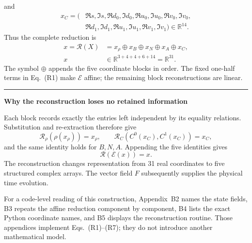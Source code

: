 \documentclass[10pt,letterpaper,twocolumn]{article}
\newcommand{\R}{\mathbb R}
\newcommand{\tracebox}[3]{%
  \par\smallskip
  \noindent\begin{minipage}{\columnwidth}
    {\color{#1}\rule{\columnwidth}{1.1pt}}\par\vspace{-1pt}
    \small\textbf{\color{#1}#3}\par\smallskip\color{black}
}
\newcommand{\closetracebox}{%
  \par\vspace{1pt}{\color{navy!35}\rule{\columnwidth}{0.35pt}}
  \end{minipage}\par\smallskip
}
\begin{document}
and
{\footnotesize
\[
\begin{aligned}
x_C=(&\Re s,\Im s,
\Re d_0,\Im d_0,\Re u_0,\Im u_0,\Re v_0,\Im v_0,\\
&\Re d_1,\Im d_1,\Re u_1,\Im u_1,\Re v_1,\Im v_1)
\in\R^{14}.
\end{aligned}
\tag{R6}
\]
}
Thus the complete reduction is
\[
\boxed{
\begin{aligned}
x=\mathcal R(X)
&=x_\rho\oplus x_B\oplus x_N\oplus x_A\oplus x_C,\\
x&\in\R^{3+4+4+6+14}=\R^{31}.
\end{aligned}}
\tag{R7}
\]
The symbol \(\oplus\) appends the five coordinate blocks in order.  The fixed
one-half terms in Eq.~(R1) make \(\mathcal E\) affine; the remaining block
reconstructions are linear.

\tracebox{navy}{paleblue}{Why the reconstruction loses no retained information}
Each block records exactly the entries left independent by its equality
relations.  Substitution and re-extraction therefore give
\[
\mathcal R_\rho(\rho(x_\rho))=x_\rho,
\qquad
\mathcal R_C(C^0(x_C),C^1(x_C))=x_C,
\]
and the same identity holds for \(B,N,A\).  Appending the five identities
gives
\[
\boxed{\mathcal R(\mathcal E(x))=x.}
\]
The reconstruction changes representation from 31 real coordinates to five
structured complex arrays.  The vector field \(F\) subsequently supplies the
physical time evolution.
\closetracebox

For a code-level reading of this construction, Appendix~B2 names the state
fields, B3 repeats the affine reduction component by component, B4 lists the
exact Python coordinate names, and B5 displays the reconstruction routine.
Those appendices implement Eqs.~(R1)--(R7); they do not introduce another
mathematical model.
\end{document}
